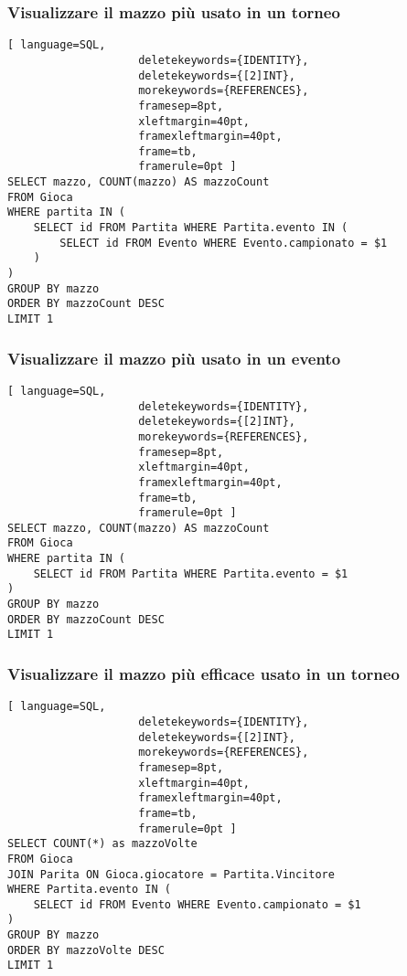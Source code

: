 \documentclass{article}
\begin{document}
\subsubsection{Visualizzare il mazzo più usato in un torneo}
\begin{lstlisting}[ language=SQL,
                    deletekeywords={IDENTITY},
                    deletekeywords={[2]INT},
                    morekeywords={REFERENCES},
                    framesep=8pt,
                    xleftmargin=40pt,
                    framexleftmargin=40pt,
                    frame=tb,
                    framerule=0pt ]
SELECT mazzo, COUNT(mazzo) AS mazzoCount
FROM Gioca
WHERE partita IN (
    SELECT id FROM Partita WHERE Partita.evento IN (
        SELECT id FROM Evento WHERE Evento.campionato = $1
    )
)
GROUP BY mazzo
ORDER BY mazzoCount DESC
LIMIT 1
\end{lstlisting}

\subsubsection{Visualizzare il mazzo più usato in un evento}
\begin{lstlisting}[ language=SQL,
                    deletekeywords={IDENTITY},
                    deletekeywords={[2]INT},
                    morekeywords={REFERENCES},
                    framesep=8pt,
                    xleftmargin=40pt,
                    framexleftmargin=40pt,
                    frame=tb,
                    framerule=0pt ]
SELECT mazzo, COUNT(mazzo) AS mazzoCount
FROM Gioca
WHERE partita IN (
    SELECT id FROM Partita WHERE Partita.evento = $1
)
GROUP BY mazzo
ORDER BY mazzoCount DESC
LIMIT 1
\end{lstlisting}

\subsubsection{Visualizzare il mazzo più efficace usato in un torneo}
\begin{lstlisting}[ language=SQL,
                    deletekeywords={IDENTITY},
                    deletekeywords={[2]INT},
                    morekeywords={REFERENCES},
                    framesep=8pt,
                    xleftmargin=40pt,
                    framexleftmargin=40pt,
                    frame=tb,
                    framerule=0pt ]
SELECT COUNT(*) as mazzoVolte
FROM Gioca
JOIN Parita ON Gioca.giocatore = Partita.Vincitore
WHERE Partita.evento IN (
    SELECT id FROM Evento WHERE Evento.campionato = $1
)
GROUP BY mazzo
ORDER BY mazzoVolte DESC
LIMIT 1
\end{lstlisting}
\end{document}
